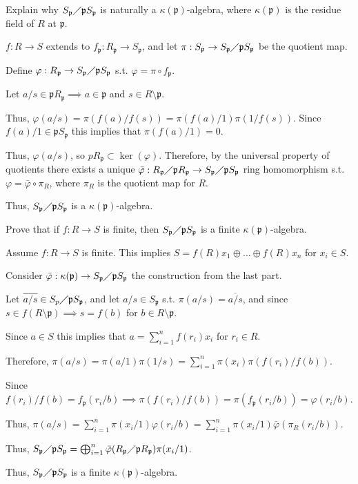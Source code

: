 \documentclass[12pt, letterpaper]{article}
\newcommand{\p}{\mathfrak{p}}
\begin{document}
\begin{subproblem}{}
    Explain why $S_\p \diagup \p S_\p$ is naturally a $\kappa(\p)$-algebra, where $\kappa(\p)$ is the residue field of $R$
at $\p$.
\end{subproblem}
\begin{problemproof}
    $f : R \to S$ extends to $f_\p : R_\p \to S_\p$, and let $\pi : S_\p \to S_\p \diagup \p S_\p$ be the quotient map.

    Define $\varphi : R_\p \to S_\p \diagup \p S_\p$ s.t. $\varphi=\pi \circ f_\p$.

    Let $a/s \in \p R_\p \implies a \in \p$ and $s \in R \setminus \p$.

    Thus, $\varphi(a / s)=\pi(f(a)/f(s))=\pi(f(a)/1)\pi(1/f(s))$. Since $f(a)/1 \in \p S_\p$ this implies that $\pi(f(a)/1)=0$.

    Thus, $\varphi(a/s)$, so $p R_\p \subset \ker(\varphi)$. Therefore, by the universal property of quotients there exists a unique
    $\bar{\varphi} : R_\p \diagup \p R_\p \to S_\p \diagup \p S_\p$ ring homomorphism s.t. $\varphi=\bar{\varphi} \circ \pi_R$, where $\pi_R$ is the quotient map for $R$.

    Thus, $S_\p \diagup \p S_\p$ is a $\kappa(\p)$-algebra.
\end{problemproof}

\begin{subproblem}{}
    Prove that if $f : R \to S$ is finite, then $S_\p \diagup \p S_\p$ is a finite $\kappa(\p)$-algebra.
\end{subproblem}
\begin{problemproof}
    Assume $f: R \to S$ is finite. This implies $S=f(R)x_1 \oplus \dots \oplus f(R)x_n$ for $x_i \in S$.

    Consider $\bar{\varphi} : \kappa(\p) \to S_\p \diagup \p S_\p$ the construction from the last part.

    Let $\overline{a/s} \in S_p \diagup \p S_\p$, and let $a/s \in S_\p$ s.t. $\pi(a/s)=\overline{a/s}$, and since $s \in f(R \setminus \p) \implies s=f(b)$ for $b \in R \setminus \p$.

    Since $a \in S$ this implies that $a=\sum_{i=1}^nf(r_i)x_i$ for $r_i \in R$.

    Therefore, $\pi(a/s)=\pi(a/1)\pi(1/s)=\sum_{i=1}^n \pi(x_i)\pi(f(r_i)/f(b))$.

    Since $f(r_i)/f(b)=f_\p(r_i/b) \implies \pi(f(r_i)/f(b))=\pi(f_\p(r_i/b))=\varphi(r_i/b)$.

    Thus, $\pi(a/s)=\sum_{i=1}^n\pi(x_i/1)\varphi(r_i/b)=\sum_{i=1}^n\pi(x_i/1)\bar{\varphi}(\pi_R(r_i/b))$.

    Thus, $S_\p \diagup \p S_\p = \bigoplus_{i=1}^n \bar{\varphi}(R_\p \diagup \p R_\p) \pi(x_i/1)$.

    Thus, $S_\p \diagup \p S_\p$ is a finite $\kappa(\p)$-algebra.
\end{problemproof}
\end{document}
